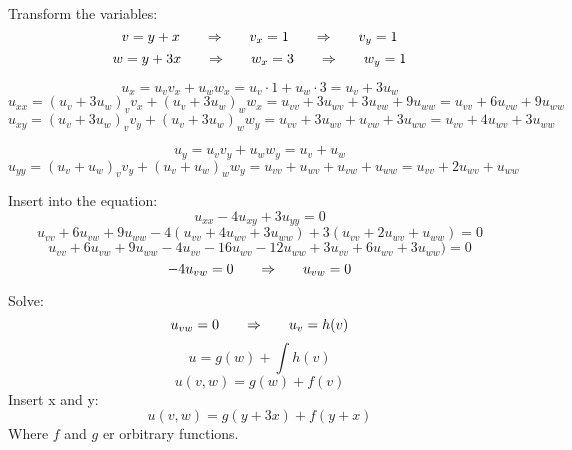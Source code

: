 Transform the variables:
$$v=y+x{\qquad\Rightarrow\qquad} v_x=1{\qquad\Rightarrow\qquad} v_y=1$$
$$w=y+3x{\qquad\Rightarrow\qquad} w_x=3{\qquad\Rightarrow\qquad} w_y=1$$

$$u_x=u_v v_x+u_w w_x=u_v \cdot 1+u_w \cdot 3=u_v+3u_w$$
$$u_{xx}=(u_v+3u_w)_v v_x+(u_v+3u_w)_w w_x=u_{vv}+3u_{wv}+3u_{vw}+9u_{ww}=\boxed{u_{vv}+6u_{vw}+9u_{ww}}$$
$$u_{xy}=(u_v+3u_w)_v v_y+(u_v+3u_w)_w w_y=u_{vv}+3u_{wv}+u_{vw}+3u_{ww}=\boxed{u_{vv}+4u_{wv}+3u_{ww}}$$

$$u_y=u_v v_y + u_w w_y=\boxed{u_v+u_w}$$
$$u_{yy}=(u_v+u_w)_v v_y+(u_v+u_w)_w w_y=u_{vv}+u_{wv}+u_{vw}+u_{ww}=\boxed{u_{vv}+2u_{wv}+u_{ww}}$$

Insert into the equation:
$$u_{xx}-4u_{xy}+3u_{yy}=0$$
$$u_{vv}+6u_{vw}+9u_{ww}-4(u_{vv}+4u_{wv}+3u_{ww})+3(u_{vv}+2u_{wv}+u_{ww})=0$$
$$u_{vv}+6u_{vw}+9u_{ww}-4u_{vv}-16u_{wv}-12u_{ww}+3u_{vv}+6u_{wv}+3u_{ww})=0$$
$$-4u_{vw}=0{\qquad\Rightarrow\qquad} u_{vw}=0$$

Solve:
$$u_{vw}=0{\qquad\Rightarrow\qquad} u_v=h(v)$$
$$u=g(w)+\int h(v)$$
$$u(v,w)=g(w)+f(v)$$
Insert x and y:
$$u(v,w)=g(y+3x)+f(y+x)$$
Where $f$ and $g$ er orbitrary functions.
